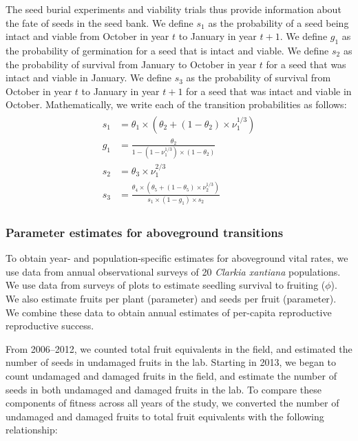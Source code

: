 \documentclass[12pt, oneside, titlepage]{article}   	%
\begin{document}
The seed burial experiments and viability trials thus provide information about the fate of seeds in the seed bank. We define $s_1$ as the probability of a seed being intact and viable from October in year $t$ to January in year $t+1$. We define $g_1$ as the probability of germination for a seed that is intact and viable. We define $s_2$ as the probability of survival from January to October in year $t$ for a seed that was intact and viable in January. We define $s_3$ as the probability of survival from October in year $t$ to January in year $t+1$ for a seed that was intact and viable in October. Mathematically, we write each of the transition probabilities as follows:
%
    \begin{align}
\begin{split}
s_1 & = \theta_1 \times (\theta_2 + ( 1- \theta_2 ) \times \nu_1^{1/3} ) \\
g_1 & = \frac{\theta_2 }{1 - ( 1-  \nu_1^{1/3} ) \times ( 1 - \theta_2 )} \\
s_2 & = \theta_3 \times \nu_1^{2/3} \\
s_3 & = \frac{\theta_4 \times (\theta_5 + ( 1- \theta_5 ) \times \nu_2^{1/3} )}{s_1 \times (1-g_1) \times s_2 }
  \end{split}
\end{align}
%

\subsubsection*{Parameter estimates for aboveground transitions}

To obtain year- and population-specific estimates for aboveground vital rates, we use data from annual observational surveys of 20 \textit{Clarkia xantiana} populations. We use data from surveys of plots to estimate seedling survival to fruiting ($\phi$). We also estimate fruits per plant (parameter) and seeds per fruit (parameter). We combine these data to obtain annual estimates of per-capita reproductive reproductive success.

From 2006--2012, we counted total fruit equivalents in the field, and estimated the number of seeds in undamaged fruits in the lab. Starting in 2013, we began to count undamaged and damaged fruits in the field, and estimate the number of seeds in both undamaged and damaged fruits in the lab. To compare these components of fitness across all years of the study, we converted the number of undamaged and damaged fruits to total fruit equivalents with the following relationship:
\end{document}
